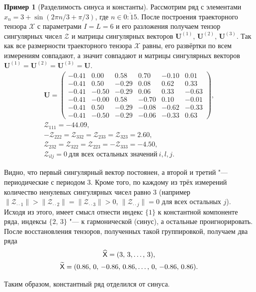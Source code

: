 \documentclass[specialist,
    substylefile = spbu_report.rtx,
    subf,href,colorlinks=true, 12pt]{disser}
\theoremstyle{plain}
\theoremstyle{definition}
\newtheorem{example}{Пример}[section]
\theoremstyle{remark}
\begin{document}
    \begin{example}[Разделимость синуса и константы]
        Рассмотрим ряд с элементами $x_n=3+\sin(2\pi n / 3 + \pi/3)$, где $n\in \overline{0:15}$.
        После построения траекторного тензора $\mathcal{X}$ с параметрами $I=L=6$ и его разложения получаем тензор
        сингулярных чисел $\mathcal{Z}$ и матрицы сингулярных векторов $\mathbf{U}^{(1)},\, \mathbf{U}^{(2)},\,\mathbf{U}^{(3)}$.
        Так как все размерности траекторного тензора $\mathcal{X}$ равны, его развёртки по всем
        измерениям совпадают, а значит совпадают и матрицы сингулярных векторов $\mathbf{U}^{(1)}=\mathbf{U}^{(2)}=\mathbf{U}^{(3)}=\mathbf{U}$.
        \begin{gather*}
            \mathbf{U}=
            \begin{pmatrix}
                -0.41 & 0.00  & 0.58  & 0.70  & -0.10 & 0.01  \\
                -0.41 & 0.50  & -0.29 & 0.08  & 0.62  & 0.33  \\
                -0.41 & -0.50 & -0.29 & 0.06  & 0.33  & -0.63 \\
                -0.41 & -0.00 & 0.58  & -0.70 & 0.10  & -0.01 \\
                -0.41 & 0.50  & -0.29 & -0.08 & -0.62 & -0.33 \\
                -0.41 & -0.50 & -0.29 & -0.06 & -0.33 & 0.63
            \end{pmatrix},\\
            \mathcal{Z}_{111}=-44.09,\\
            -\mathcal{Z}_{222}=\mathcal{Z}_{332}=\mathcal{Z}_{233}=\mathcal{Z}_{323}=2.60,\\
            \mathcal{Z}_{232}=\mathcal{Z}_{322}=\mathcal{Z}_{223}=-\mathcal{Z}_{333}=-4.50,\\
            \mathcal{Z}_{ilj}=0~\text{для всех остальных значений}~i, l, j.
        \end{gather*}

        Видно, что первый сингулярный вектор постоянен, а второй и третий "--- периодические с периодом 3.
        Кроме того, по каждому из трёх измерений количество ненулевых сингулярных чисел равно 3
        (например $\|\mathcal{Z}_{\cdot \cdot 1}\|>\|\mathcal{Z}_{\cdot \cdot 2}\|=\|\mathcal{Z}_{\cdot \cdot 3}\|>0$, $\|\mathcal{Z}_{\cdot \cdot j}\|=0$ для всех остальных $j$).
        Исходя из этого, имеет смысл отнести индекс $\{1\}$ к константной компоненте ряда, индексы $\{2,\, 3\}$ "---
        к гармонической (синус), а остальные проигнорировать.
        После восстановления тензоров, полученных такой группировкой, получаем два ряда
        \begin{gather*}
            \widehat{\mathsf{X}}=(3,\, 3,\ldots,\, 3),\\
            \widetilde{\mathsf{X}}=(0.86,\, 0,\, -0.86,\,  0.86,\ldots,\, 0,\, -0.86,\, 0.86).
        \end{gather*}

        Таким образом, константный ряд отделился от синуса.
    \end{example}
\end{document}
